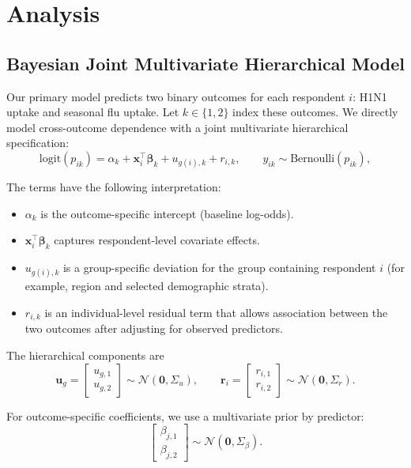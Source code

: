 \section{Analysis}

\subsection{Bayesian Joint Multivariate Hierarchical Model}

Our primary model predicts two binary outcomes for each respondent $i$: H1N1 uptake and seasonal flu uptake. Let $k \in \{1,2\}$ index these outcomes. We directly model cross-outcome dependence with a joint multivariate hierarchical specification:
\[
\mathrm{logit}(p_{ik}) = \alpha_k + \mathbf{x}_i^\top \boldsymbol{\beta}_k + u_{g(i),k} + r_{i,k},
\qquad
y_{ik} \sim \mathrm{Bernoulli}(p_{ik}),
\]

The terms have the following interpretation:
\begin{itemize}
\item $\alpha_k$ is the outcome-specific intercept (baseline log-odds).
\item $\mathbf{x}_i^\top \boldsymbol{\beta}_k$ captures respondent-level covariate effects.
\item $u_{g(i),k}$ is a group-specific deviation for the group containing respondent $i$ (for example, region and selected demographic strata).
\item $r_{i,k}$ is an individual-level residual term that allows association between the two outcomes after adjusting for observed predictors.
\end{itemize}

The hierarchical components are
\[
\mathbf{u}_g =
\begin{bmatrix}
u_{g,1}\\
u_{g,2}
\end{bmatrix}
\sim
\mathcal{N}(\mathbf{0},\Sigma_u),
\qquad
\mathbf{r}_i =
\begin{bmatrix}
r_{i,1}\\
r_{i,2}
\end{bmatrix}
\sim
\mathcal{N}(\mathbf{0},\Sigma_r).
\]

For outcome-specific coefficients, we use a multivariate prior by predictor:
\[
\begin{bmatrix}
\beta_{j,1}\\
\beta_{j,2}
\end{bmatrix}
\sim
\mathcal{N}(\mathbf{0},\Sigma_\beta).
\]

